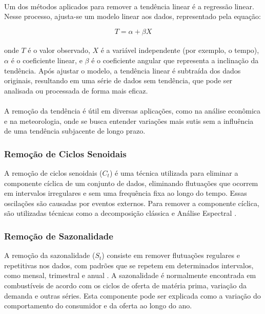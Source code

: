 \paragraph{} Um dos métodos aplicados para remover a tendência linear é a regressão linear. Nesse processo, ajusta-se um modelo linear aos dados, representado pela equação:

\begin{equation}
	T = \alpha + \beta X
	\label{eq:linear-regression}
\end{equation}
\paragraph{} onde \(T\) é o valor observado, \(X\) é a variável independente (por exemplo, o tempo), \(\alpha\) é o coeficiente linear, e \(\beta\) é o coeficiente angular que representa a inclinação da tendência. Após ajustar o modelo, a tendência linear é subtraída dos dados originais, resultando em uma série de dados sem tendência, que pode ser analisada ou processada de forma mais eficaz.
\paragraph{} A remoção da tendência é útil em diversas aplicações, como na análise econômica e na meteorologia, onde se busca entender variações mais sutis sem a influência de uma tendência subjacente de longo prazo.

\subsubsection{Remoção de Ciclos Senoidais}
A remoção de ciclos senoidais (\(C_t\)) é uma técnica utilizada para eliminar a componente cíclica de um conjunto de dados, eliminando flutuações que ocorrem em intervalos irregulares e sem uma frequência fixa ao longo do tempo. Essas oscilações são causadas por eventos externos. Para remover a componente cíclica, são utilizadas técnicas como a decomposição clássica e
Análise Espectral \cite{Yasin23}.

\subsubsection{Remoção de Sazonalidade}
A remoção da sazonalidade (\(S_t\)) consiste em remover flutuações regulares e repetitivas nos dados, com padrões que se repetem em determinados intervalos, como mensal, trimestral e anual \cite{Yasin23}. A sazonalidade é normalmente encontrada em combustíveis de acordo com os ciclos de oferta de matéria prima, variação da demanda e outras séries. Esta componente pode ser explicada como a variação do comportamento do consumidor e da oferta ao longo do ano.

